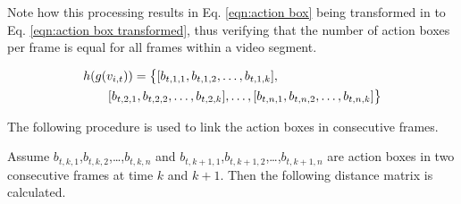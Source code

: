 
Note how this processing results in Eq. \ref{eqn:action box}
being transformed in to Eq. \ref{eqn:action box transformed},
thus verifying that the number of action boxes per frame is equal for all frames within a video segment.

\begin{equation}
\label{eqn:action box transformed}
\begin{split}
\MoveEqLeft
 h(g(v_{i,t})) = \big\{[b_{t,1,1},b_{t,1,2},\dots,b_{t,1,k}],\\
 & [b_{t,2,1},b_{t,2,2},\dots,b_{t,2,k}],\dots,[b_{t,n,1},b_{t,n,2},\dots,b_{t,n,k}]\big\}
\end{split}
\end{equation}


The following procedure is used to link the action boxes in consecutive frames.

Assume $b_{t,k,1}$,$b_{t,k,2}$,\dots,$b_{t,k,n}$ and $b_{t,k+1,1}$,$b_{t,k+1,2}$,\dots,$b_{t,k+1,n}$  are action boxes in two
consecutive frames at time $k$ and $k+1$. Then the following distance matrix is calculated.



